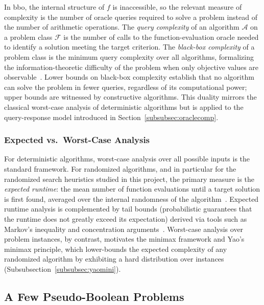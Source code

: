 In \acrshort{bbo}, the internal structure of $f$ is
inaccessible, so the relevant measure of complexity is the number of
oracle queries
required to solve a problem instead of the
number of arithmetic operations. The \textit{query complexity} of an
algorithm $\mathcal{A}$ on a problem class $\mathcal{F}$ is the
number of calls to the function-evaluation oracle needed to identify
a solution meeting the target criterion. The \textit{black-box
complexity} of a problem class is the minimum query complexity over
all algorithms, formalizing the information-theoretic difficulty of
the problem when only objective values are
observable~\cite{droste2006blackbox}. Lower bounds on black-box
complexity establish that no algorithm can solve the problem in fewer
queries, regardless of its computational power; upper bounds are
witnessed by constructive algorithms. This duality mirrors the
classical worst-case analysis of deterministic algorithms but is
applied to the query-response model introduced in
Section~\ref{subsubsec:oraclecomp}.

\subsubsection{Expected vs.\ Worst-Case Analysis}

For deterministic algorithms, worst-case analysis over all possible
inputs is the standard framework. For randomized algorithms, and in
particular for the randomized search heuristics studied in this
project, the primary measure is the \textit{expected runtime}: the
mean number of function evaluations until a target solution is first
found, averaged over the internal randomness of the
algorithm~\cite{droste2002analysis,doerr2020theory}. Expected
runtime analysis is complemented by tail bounds (probabilistic
  guarantees that the runtime does not greatly exceed its
expectation) derived via tools such as Markov's inequality and
concentration arguments~\cite{doerr2020theory}. Worst-case analysis
over problem instances, by contrast, motivates the minimax framework
and Yao's minimax principle, which lower-bounds the expected
complexity of any randomized algorithm by exhibiting a hard
distribution over instances~\cite{droste2006blackbox}
(Subsubsection~\ref{subsubsec:yaomini}).

\subsection{A Few Pseudo-Boolean Problems}

